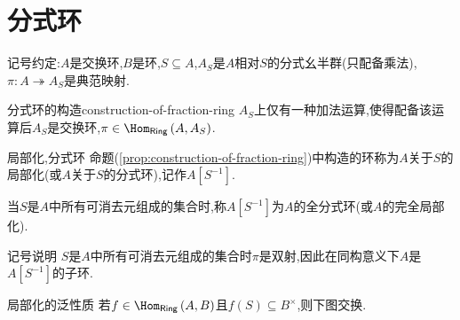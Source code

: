 \section{分式环}

记号约定:$A$是交换环,$B$是环,$S\subseteq A$,$A_{S}$是$A$相对$S$的分式幺半群(只配备乘法),$\pi:A\twoheadrightarrow A_{S}$是典范映射.

\begin{proposition}{分式环的构造}{construction-of-fraction-ring}
	$A_{S}$上仅有一种加法运算,使得配备该运算后$A_{S}$是交换环,$\pi\in\Hom_{\mathsf{Ring}}\left(A,A_{S}\right)$.
\end{proposition}

\begin{definition}{局部化,分式环}{}
	命题(\ref{prop:construction-of-fraction-ring})中构造的环称为$A$关于$S$的局部化(或$A$关于$S$的分式环),记作$A\left[S^{-1}\right]$.
	
	当$S$是$A$中所有可消去元组成的集合时,称$A\left[S^{-1}\right]$为$A$的全分式环(或$A$的完全局部化).
\end{definition}

\begin{remark}{记号说明}{}
	$S$是$A$中所有可消去元组成的集合时$\pi$是双射,因此在同构意义下$A$是$A\left[S^{-1}\right]$的子环.
\end{remark}

\begin{theorem}{局部化的泛性质}{}
	若$f\in\Hom_{\mathsf{Ring}}\left(A,B\right)$且$f\left(S\right)\subseteq B^{\times}$,则下图交换.
	\begin{center}
	\end{center}
\end{theorem}


























